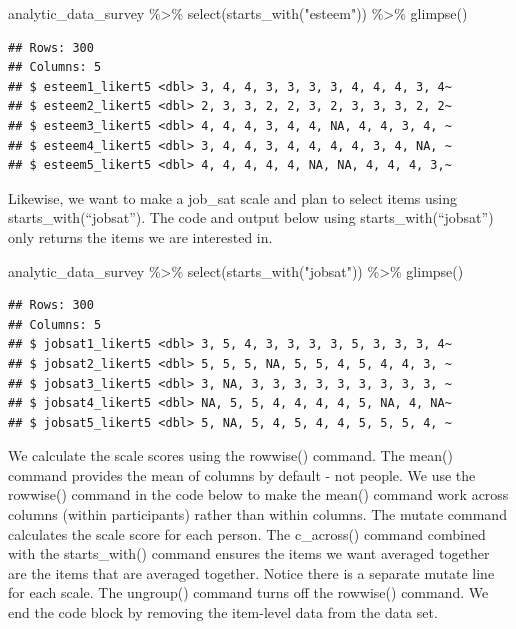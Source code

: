 \documentclass[
]{krantz}
\makeatletter
\newenvironment{Shaded}{\begin{snugshade}}{\end{snugshade}}
\newcommand{\FunctionTok}[1]{\textcolor[rgb]{0,0,0}{#1}}
\newcommand{\NormalTok}[1]{#1}
\newcommand{\SpecialCharTok}[1]{\textcolor[rgb]{0,0,0}{#1}}
\newcommand{\StringTok}[1]{\textcolor[rgb]{0.5,0.5,0.5}{#1}}
\newenvironment{kframe}{%
\medskip{}
\setlength{\fboxsep}{.8em}
 \def\at@end@of@kframe{}%
 \ifinner\ifhmode%
  \def\at@end@of@kframe{\end{minipage}}%
  \begin{minipage}{\columnwidth}%
 \fi\fi%
 \def\FrameCommand##1{\hskip\@totalleftmargin \hskip-\fboxsep
 \colorbox{shadecolor}{##1}\hskip-\fboxsep
     \hskip-\linewidth \hskip-\@totalleftmargin \hskip\columnwidth}%
 \MakeFramed {\advance\hsize-\width
   \@totalleftmargin\z@ \linewidth\hsize
   \@setminipage}}%
 {\par\unskip\endMakeFramed%
 \at@end@of@kframe}
\renewenvironment{Shaded}{\begin{kframe}}{\end{kframe}}
\makeatother
\begin{document}
\begin{Shaded}
\begin{Highlighting}[]
\NormalTok{analytic\_data\_survey }\SpecialCharTok{\%\textgreater{}\%}
  \FunctionTok{select}\NormalTok{(}\FunctionTok{starts\_with}\NormalTok{(}\StringTok{"esteem"}\NormalTok{)) }\SpecialCharTok{\%\textgreater{}\%}
  \FunctionTok{glimpse}\NormalTok{()}
\end{Highlighting}
\end{Shaded}

\begin{verbatim}
## Rows: 300
## Columns: 5
## $ esteem1_likert5 <dbl> 3, 4, 4, 3, 3, 3, 3, 4, 4, 4, 3, 4~
## $ esteem2_likert5 <dbl> 2, 3, 3, 2, 2, 3, 2, 3, 3, 3, 2, 2~
## $ esteem3_likert5 <dbl> 4, 4, 4, 3, 4, 4, NA, 4, 4, 3, 4, ~
## $ esteem4_likert5 <dbl> 3, 4, 4, 3, 4, 4, 4, 4, 3, 4, NA, ~
## $ esteem5_likert5 <dbl> 4, 4, 4, 4, 4, NA, NA, 4, 4, 4, 3,~
\end{verbatim}

Likewise, we want to make a job\_sat scale and plan to select items using starts\_with(``jobsat''). The code and output below using starts\_with(``jobsat'') only returns the items we are interested in.

\begin{Shaded}
\begin{Highlighting}[]
\NormalTok{analytic\_data\_survey }\SpecialCharTok{\%\textgreater{}\%}
  \FunctionTok{select}\NormalTok{(}\FunctionTok{starts\_with}\NormalTok{(}\StringTok{"jobsat"}\NormalTok{)) }\SpecialCharTok{\%\textgreater{}\%}
  \FunctionTok{glimpse}\NormalTok{()}
\end{Highlighting}
\end{Shaded}

\begin{verbatim}
## Rows: 300
## Columns: 5
## $ jobsat1_likert5 <dbl> 3, 5, 4, 3, 3, 3, 3, 5, 3, 3, 3, 4~
## $ jobsat2_likert5 <dbl> 5, 5, 5, NA, 5, 5, 4, 5, 4, 4, 3, ~
## $ jobsat3_likert5 <dbl> 3, NA, 3, 3, 3, 3, 3, 3, 3, 3, 3, ~
## $ jobsat4_likert5 <dbl> NA, 5, 5, 4, 4, 4, 4, 5, NA, 4, NA~
## $ jobsat5_likert5 <dbl> 5, NA, 5, 4, 5, 4, 4, 5, 5, 5, 4, ~
\end{verbatim}

We calculate the scale scores using the rowwise() command. The mean() command provides the mean of columns by default - not people. We use the rowwise() command in the code below to make the mean() command work across columns (within participants) rather than within columns. The mutate command calculates the scale score for each person. The c\_across() command combined with the starts\_with() command ensures the items we want averaged together are the items that are averaged together. Notice there is a separate mutate line for each scale. The ungroup() command turns off the rowwise() command. We end the code block by removing the item-level data from the data set.
\end{document}
